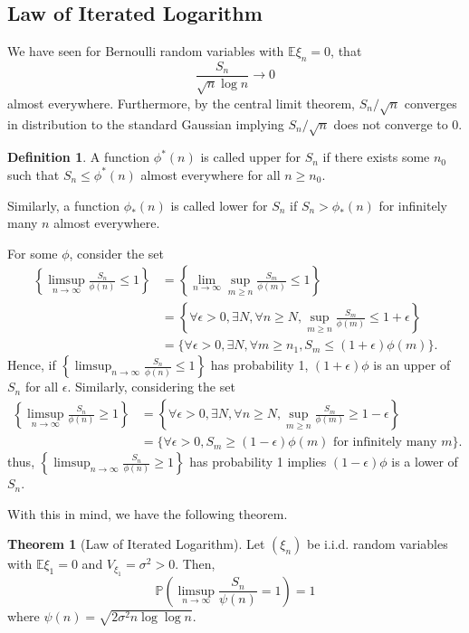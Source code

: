 \documentclass[]{article}
\theoremstyle{definition}
\newtheorem{theorem}{Theorem}
\theoremstyle{definition}
\newtheorem{definition}{Definition}[section]
\begin{document}
\subsection{Law of Iterated Logarithm}

We have seen for Bernoulli random variables with \(\mathbb{E}\xi_n = 0\), that 
\[\frac{S_n}{\sqrt{n}\log n} \to 0\]
almost everywhere. Furthermore, by the central limit theorem, 
\(S_n / \sqrt{n}\) converges in distribution to the standard Gaussian implying 
\(S_n / \sqrt{n}\) does not converge to 0. 

\begin{definition}
  A function \(\phi^*(n)\) is called upper for \(S_n\) if there exists some 
  \(n_0\) such that \(S_n \le \phi^*(n)\) almost everywhere for all 
  \(n \ge n_0\).

  Similarly, a function \(\phi_*(n)\) is called lower for \(S_n\) if  
  \(S_n > \phi_*(n)\) for infinitely many \(n\) almost everywhere.
\end{definition}

For some \(\phi\), consider the set 
\[\begin{split}
  \left\{\limsup_{n \to \infty} \frac{S_n}{\phi(n)} \le 1\right\} 
  & = \left\{\lim_{n \to \infty} \sup_{m \ge n} \frac{S_m}{\phi(m)} \le 1\right\}\\
  & = \left\{\forall \epsilon > 0, \exists N, \forall n \ge N, \sup_{m \ge n} \frac{S_m}{\phi(m)} \le 1 + \epsilon\right\}\\
  & = \{\forall \epsilon > 0, \exists N, \forall m \ge n_1, S_m \le (1 + \epsilon)\phi(m)\}.
\end{split}\]
Hence, if \(\left\{\limsup_{n \to \infty} \frac{S_n}{\phi(n)} \le 1\right\}\) has 
probability 1, \((1 + \epsilon)\phi\) is an upper of \(S_n\) for all \(\epsilon\). 
Similarly, considering the set 
\[\begin{split}
  \left\{\limsup_{n \to \infty} \frac{S_n}{\phi(n)} \ge 1\right\} 
  & = \left\{\forall \epsilon > 0, \exists N, \forall n \ge N, \sup_{m \ge n} \frac{S_m}{\phi(m)} \ge 1 - \epsilon\right\}\\
  & = \{\forall \epsilon > 0, S_m \ge (1 - \epsilon)\phi(m) \text{ for infinitely many } m\}.
\end{split}\]
thus, \(\left\{\limsup_{n \to \infty} \frac{S_n}{\phi(n)} \ge 1\right\}\) has 
probability 1 implies \((1 - \epsilon)\phi\) is a lower of \(S_n\).

With this in mind, we have the following theorem.

\begin{theorem}[Law of Iterated Logarithm]
  Let \((\xi_n)\) be i.i.d. random variables with \(\mathbb{E}\xi_1 = 0\) and 
  \(V_{\xi_1} = \sigma^2 > 0\). Then, 
  \[\mathbb{P}\left(\limsup_{n \to \infty} \frac{S_n}{\psi(n)} = 1\right) = 1\]
  where \(\psi(n) = \sqrt{2 \sigma^2 n \log \log n}\).
\end{theorem}
\end{document}
